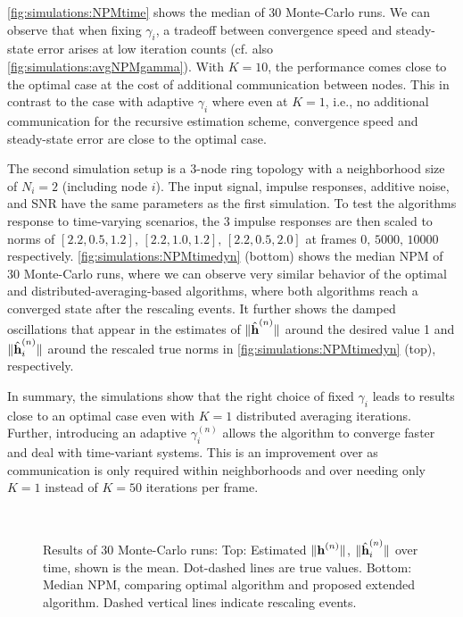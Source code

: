 \documentclass{article}
\begin{document}
\autoref{fig:simulations:NPMtime} shows the median of 30 Monte-Carlo runs.
We can observe that when fixing \(\gamma_i\), a tradeoff between convergence speed and steady-state error arises at low iteration counts (cf. also \autoref{fig:simulations:avgNPMgamma}).
With \(K=10\), the performance comes close to the optimal case at the cost of additional communication between nodes.
This in contrast to the case with adaptive \(\gamma_i\) where even at \(K=1\), i.e., no additional communication for the recursive estimation scheme, convergence speed and steady-state error are close to the optimal case.

The second simulation setup is a \(3\)-node ring topology with a neighborhood size of \(N_i=2\) (including node \(i\)).
The input signal, impulse responses, additive noise, and SNR have the same parameters as the first simulation.
To test the algorithms response to time-varying scenarios, the 3 impulse responses are then scaled to norms of \([2.2, 0.5, 1.2],\, [2.2, 1.0, 1.2],\, [2.2, 0.5, 2.0]\) at frames \(0,\, 5000,\, 10000\) respectively.
\autoref{fig:simulations:NPMtimedyn} (bottom) shows the median NPM of 30 Monte-Carlo runs, where we can observe very similar behavior of the optimal and distributed-averaging-based algorithms, where both algorithms reach a converged state after the rescaling events.
It further shows the damped oscillations that appear in the estimates of \(\|\hat{\bm{\mathrm{h}}}^{(n)}\|\) around the desired value 1 and \(\|\hat{\bm{\mathrm{h}}}_i^{(n)}\|\) around the rescaled true norms in \autoref{fig:simulations:NPMtimedyn} (top), respectively.

In summary, the simulations show that the right choice of fixed \(\gamma_i\) leads to results close to an optimal case even with \(K=1\) distributed averaging iterations.
Further, introducing an adaptive \(\gamma_i^{(n)}\) allows the algorithm to converge faster and deal with time-variant systems.
This is an improvement over \cite{blochbergerDBSI} as communication is only required within neighborhoods and over \cite{yuDistributedBlindSystem2014, liuDistributedBlindIdentification2016} needing only \(K=1\) instead of \(K=50\) iterations per frame.

\begin{figure}[t]
    \centering
    \\\vspace*{-1.2cm}
    
    \vspace*{-0.6cm}
    \caption[]{Results of 30 Monte-Carlo runs: Top: Estimated \(\|\bm{\mathrm{h}}^{(n)}\|\), \(\|\hat{\bm{\mathrm{h}}}_i^{(n)}\|\) over time, shown is the mean. Dot-dashed lines are true values. Bottom: Median NPM, comparing optimal algorithm and proposed extended algorithm. Dashed vertical lines indicate rescaling events.}
    \label{fig:simulations:NPMtimedyn}
\end{figure}
\end{document}
